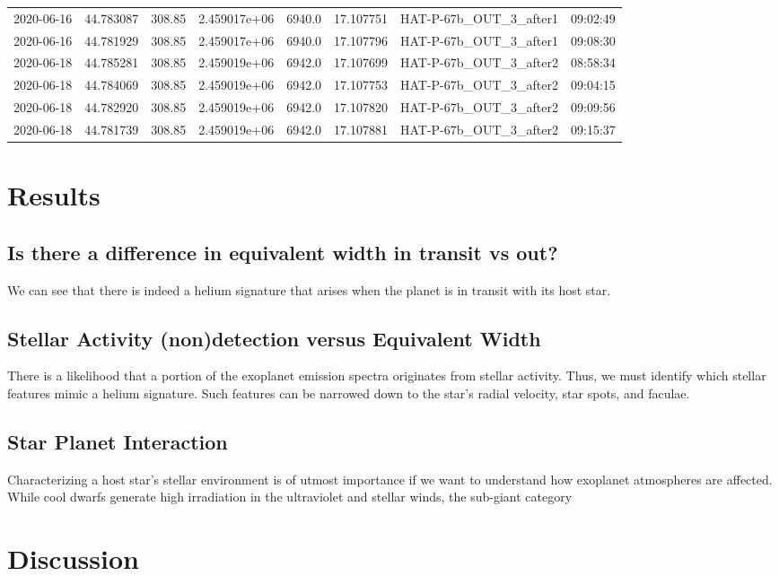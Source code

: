 \documentclass[modern]{aastex631}
\begin{document}
\begin{tabular}{lrrrlrll}
    2020-06-16 & 44.783087   & 308.85        & 2.459017e+06 & 6940.0 & 17.107751 & HAT-P-67b\_OUT\_3\_after1  & 09:02:49 \\
    2020-06-16 & 44.781929   & 308.85        & 2.459017e+06 & 6940.0 & 17.107796 & HAT-P-67b\_OUT\_3\_after1  & 09:08:30 \\
    2020-06-18 & 44.785281   & 308.85        & 2.459019e+06 & 6942.0 & 17.107699 & HAT-P-67b\_OUT\_3\_after2  & 08:58:34 \\
    2020-06-18 & 44.784069   & 308.85        & 2.459019e+06 & 6942.0 & 17.107753 & HAT-P-67b\_OUT\_3\_after2  & 09:04:15 \\
    2020-06-18 & 44.782920   & 308.85        & 2.459019e+06 & 6942.0 & 17.107820 & HAT-P-67b\_OUT\_3\_after2  & 09:09:56 \\
    2020-06-18 & 44.781739   & 308.85        & 2.459019e+06 & 6942.0 & 17.107881 & HAT-P-67b\_OUT\_3\_after2  & 09:15:37 \\
    \bottomrule
\end{tabular}


\section{Results}
\subsection{Is there a difference in equivalent width in transit vs out?}
We can see that there is indeed a helium signature that arises when the planet is in transit with its host star.
\subsection{Stellar Activity (non)detection versus Equivalent Width}
There is a likelihood that a portion of the exoplanet emission spectra originates from stellar activity. Thus, we must identify which stellar features mimic a helium signature. Such features can be narrowed down to the star's radial velocity, star spots, and faculae.
\subsection{Star Planet Interaction}
Characterizing a host star's stellar environment is of utmost importance if we want to understand how exoplanet atmospheres are affected. While cool dwarfs generate high irradiation in the ultraviolet and stellar winds, the sub-giant category

\section{Discussion}
\end{document}
